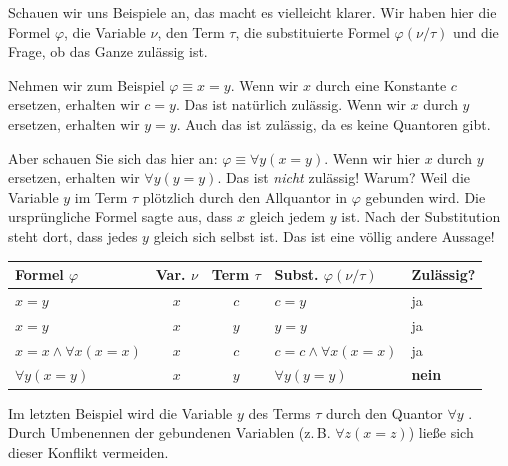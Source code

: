\begin{spoken-clean}[01:19:27 - 01:22:27]
Schauen wir uns Beispiele an, das macht es vielleicht klarer.  Wir haben hier die Formel $\varphi$, die Variable $\nu$, den Term $\tau$, die substituierte Formel $\varphi(\nu/\tau)$ und die Frage, ob das Ganze zulässig ist.

Nehmen wir zum Beispiel $\varphi \equiv x = y$. Wenn wir $x$ durch eine Konstante $c$ ersetzen, erhalten wir $c = y$. Das ist natürlich zulässig. Wenn wir $x$ durch $y$ ersetzen, erhalten wir $y = y$. Auch das ist zulässig, da es keine Quantoren gibt.

Aber schauen Sie sich das hier an: $\varphi \equiv \forall y (x = y)$. Wenn wir hier $x$ durch $y$ ersetzen, erhalten wir $\forall y (y = y)$. Das ist \emph{nicht} zulässig! Warum? Weil die Variable $y$ im Term $\tau$ plötzlich durch den Allquantor in $\varphi$ gebunden wird. Die ursprüngliche Formel sagte aus, dass $x$ gleich jedem $y$ ist. Nach der Substitution steht dort, dass jedes $y$ gleich sich selbst ist. Das ist eine völlig andere Aussage!
\end{spoken-clean}

\begin{math-stroke}
\begin{center}
\begin{tabular}{l | c | c | l | l}
    \toprule
    \textbf{Formel $\varphi$} & \textbf{Var. $\nu$} & \textbf{Term $\tau$} & \textbf{Subst. $\varphi(\nu/\tau)$} & \textbf{Zulässig?} \\ 
    \midrule
    $x = y$ & $x$ & $c$ & $c = y$ & ja \\
    $x = y$ & $x$ & $y$ & $y = y$ & ja \\
    $x = x \wedge \forall x (x = x)$ & $x$ & $c$ & $c = c \wedge \forall x (x = x)$ & ja \\
    $\forall y (x = y)$ & $x$ & $y$ & $\forall y (y = y)$ & \textcolor{BrickRed}{\textbf{nein}} \\
    \bottomrule
\end{tabular}
\end{center}

\begin{explanation-of-steps}
Im letzten Beispiel wird die Variable $y$ des Terms $\tau$ durch den Quantor $\forall y$ . Durch Umbenennen der gebundenen Variablen (z.\,B. $\forall z (x = z)$) ließe sich dieser Konflikt vermeiden.
\end{explanation-of-steps}
\end{math-stroke}

